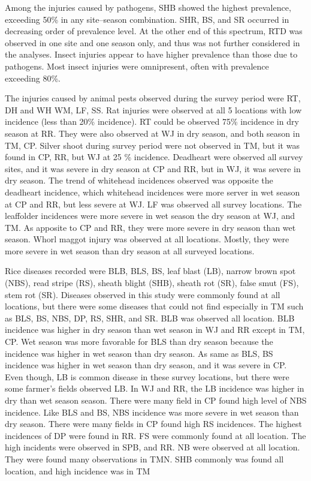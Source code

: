 Among the injuries caused by pathogens, SHB showed the highest prevalence, exceeding 50\% in any site–season combination. SHR, BS, and SR occurred in decreasing order of prevalence level. At the other end of this spectrum, RTD was observed in one site and one season only, and thus was not further considered in the analyses. Insect injuries appear to have higher prevalence than those due to pathogens. Most insect injuries were omnipresent, often with prevalence exceeding 80\%.

The injuries caused by animal pests observed during the survey period were RT, DH and WH WM, LF, SS. Rat injuries were observed at all 5 locations with low incidence (less than 20\% incidence). RT could be observed 75\% incidence in dry season at RR. They were also observed at WJ in dry season, and both season in TM, CP. Silver shoot during survey period were not observed in TM, but it was found in CP, RR, but WJ at 25 \% incidence. Deadheart were observed all survey sites, and it was severe in dry season at CP and RR, but in WJ, it was severe in dry season. The trend of whitehead incidences observed was opposite the deadheart incidence, which whitehead incidences were more server in wet season at CP and RR, but less severe at WJ. LF was observed all survey locations. The leaffolder incidences were more severe in wet season the dry season at WJ, and TM. As apposite to CP and RR, they were more severe in dry season than wet season. Whorl maggot injury was observed at all locations. Mostly, they were more severe in wet season than dry season at all surveyed locations.

Rice diseases recorded were BLB, BLS, BS, leaf blast (LB), narrow brown spot (NBS), read stripe (RS), sheath blight (SHB), sheath rot (SR), false smut (FS), stem rot (SR). Diseases observed in this study were commonly found at all locations, but there were some diseases that could not find especially in TM such as BLS, BS, NBS, DP, RS, SHR, and SR. BLB was observed all location. BLB incidence was higher in dry season than wet season in WJ and RR except in TM, CP. Wet season was more favorable for BLS than dry season because the incidence was higher in wet season than dry season. As same as BLS, BS incidence was higher in wet season than dry season, and it was severe in CP. Even though, LB is common disease in these survey locations, but there were some farmer’s fields observed LB. In WJ and RR, the LB incidence was higher in dry than wet season season. There were many field in CP found high level of NBS incidence. Like BLS and BS, NBS incidence was more severe in wet season than dry season. There were many fields in CP found high RS incidences. The highest incidences of DP were found in RR. FS were commonly found at all location. The high incidents were observed in SPB, and RR. NB were observed at all location. They were found many observations in TMN.  SHB commonly was found all location, and high incidence was in TM 

